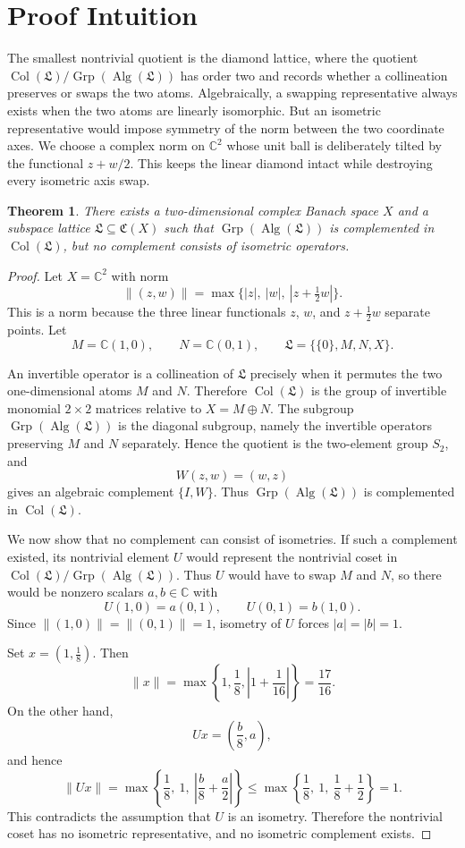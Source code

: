 \documentclass[11pt]{article}
\newtheorem{theorem}{Theorem}
\newcommand{\C}{\mathbb C}
\newcommand{\Alg}{\operatorname{Alg}}
\newcommand{\Col}{\operatorname{Col}}
\newcommand{\Grp}{\operatorname{Grp}}
\begin{document}
\section*{Proof Intuition}

The smallest nontrivial quotient is the diamond lattice, where the quotient
\(\Col(\mathfrak L)/\Grp(\Alg(\mathfrak L))\) has order two and records
whether a collineation preserves or swaps the two atoms. Algebraically, a
swapping representative always exists when the two atoms are linearly
isomorphic. But an isometric representative would impose symmetry of the norm
between the two coordinate axes. We choose a complex norm on \(\C^2\) whose
unit ball is deliberately tilted by the functional \(z+w/2\). This keeps the
linear diamond intact while destroying every isometric axis swap.

\begin{theorem}
There exists a two-dimensional complex Banach space \(X\) and a subspace
lattice \(\mathfrak L\subseteq \mathfrak C(X)\) such that
\(\Grp(\Alg(\mathfrak L))\) is complemented in \(\Col(\mathfrak L)\), but no
complement consists of isometric operators.
\end{theorem}

\begin{proof}
Let \(X=\C^2\) with norm
\[
  \|(z,w)\|=\max\{|z|,\ |w|,\ |z+\tfrac12 w|\}.
\]
This is a norm because the three linear functionals \(z\), \(w\), and
\(z+\frac12w\) separate points. Let
\[
  M=\C(1,0),\qquad N=\C(0,1),\qquad
  \mathfrak L=\{\{0\},M,N,X\}.
\]

An invertible operator is a collineation of \(\mathfrak L\) precisely when it
permutes the two one-dimensional atoms \(M\) and \(N\). Therefore
\(\Col(\mathfrak L)\) is the group of invertible monomial \(2\times2\)
matrices relative to \(X=M\oplus N\). The subgroup
\(\Grp(\Alg(\mathfrak L))\) is the diagonal subgroup, namely the invertible
operators preserving \(M\) and \(N\) separately. Hence the quotient is the
two-element group \(S_2\), and
\[
  W(z,w)=(w,z)
\]
gives an algebraic complement \(\{I,W\}\). Thus
\(\Grp(\Alg(\mathfrak L))\) is complemented in \(\Col(\mathfrak L)\).

We now show that no complement can consist of isometries. If such a complement
existed, its nontrivial element \(U\) would represent the nontrivial coset in
\(\Col(\mathfrak L)/\Grp(\Alg(\mathfrak L))\). Thus \(U\) would have to swap
\(M\) and \(N\), so there would be nonzero scalars \(a,b\in\C\) with
\[
  U(1,0)=a(0,1),\qquad U(0,1)=b(1,0).
\]
Since \(\|(1,0)\|=\|(0,1)\|=1\), isometry of \(U\) forces
\(|a|=|b|=1\).

Set \(x=(1,\frac18)\). Then
\[
  \|x\|
  =\max\left\{1,\frac18,\left|1+\frac1{16}\right|\right\}
  =\frac{17}{16}.
\]
On the other hand,
\[
  Ux=\left(\frac{b}{8},a\right),
\]
and hence
\[
  \|Ux\|
  =\max\left\{\frac18,\ 1,\ \left|\frac{b}{8}+\frac a2\right|\right\}
  \leq \max\left\{\frac18,\ 1,\ \frac18+\frac12\right\}
  =1.
\]
This contradicts the assumption that \(U\) is an isometry. Therefore the
nontrivial coset has no isometric representative, and no isometric complement
exists.
\end{proof}
\end{document}
